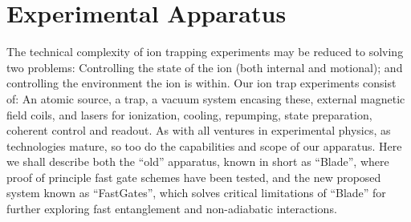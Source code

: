 \documentclass[12pt]{iopart}
\begin{document}


\section{Experimental Apparatus}

The technical complexity of ion trapping experiments may be reduced to
solving two problems: Controlling the state of the ion (both internal
and motional); and controlling the environment the ion is within.
Our ion trap experiments consist of: An atomic source, a trap, a
vacuum system encasing these, external magnetic field coils, and
lasers for ionization, cooling, repumping, state preparation, coherent
control and readout.
As with all ventures in experimental physics, as technologies mature, so
too do the capabilities and scope of our apparatus.  Here we shall
describe both the ``old'' apparatus, known in short as ``Blade'', where
proof of principle fast gate schemes have been tested, and the new
proposed system known as ``FastGates'', which solves critical
limitations of ``Blade'' for further exploring fast entanglement and
non-adiabatic interactions.
\end{document}
